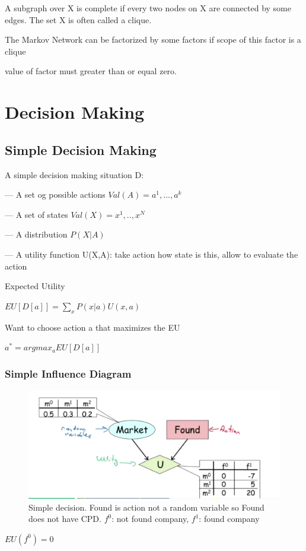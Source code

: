 \documentclass{book}
\begin{document}
A subgraph over X is complete if every two nodes on X are connected by some edges. The set X is often called a clique.

The Markov Network can be factorized by some factors if scope of this factor is a clique

value of factor must greater than or equal zero.

\chapter{Decision Making}

\section{Simple Decision Making}

A simple decision making situation D:

--- A set og possible actions $Val(A) = {a^1,...,a^k}$

--- A set of states $Val(X) = {x^1,..,x^N}$

--- A distribution $P(X|A)$

--- A utility function U(X,A): take action how state is this, allow to evaluate the action

Expected Utility

$EU[D[a]] = \sum_{x} P(x|a) U(x,a)$

Want to choose action a that maximizes the EU

$a^* = argmax_aEU[D[a]]$


\subsection{Simple Influence Diagram}
\begin{figure}[h]
\centering
\includegraphics[width=0.7\linewidth]{./figures/decision}
\caption{Simple decision. Found is action not a random variable so Found does not have CPD. $f^0$: not found company, $f^1$: found company }
\label{fig:decision}
\end{figure}

$EU(f^0) = 0$
\end{document}
